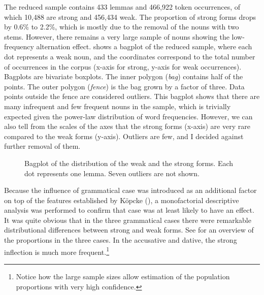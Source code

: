 \begin{styleMoutonText}
The reduced sample contains 433 lemmas and 466,922 token occurrences, of which 10,488 are strong and 456,434 weak. The proportion of strong forms drops by 0.6\% to 2.2\%, which is mostly due to the removal of the nouns with two stems. However, there remains a very large sample of nouns showing the low-frequency alternation effect.  shows a bagplot of the reduced sample, where each dot represents a weak noun, and the coordinates correspond to the total number of occurrences in the corpus (x-axis for strong, y-axis for weak occurrences). Bagplots \citep{RousseeuwEtAl1999} are bivariate boxplots. The inner polygon (\textit{bag}) contains half of the points. The outer polygon (\textit{fence}) is the bag grown by a factor of three. Data points outside the fence are considered outliers. This bagplot shows that there are many infrequent and few frequent nouns in the sample, which is trivially expected given the power-law distribution of word frequencies. However, we can also tell from the scales of the axes that the strong forms (x-axis) are very rare compared to the weak forms (y-axis). Outliers are few, and I decided against further removal of them.
\end{styleMoutonText}

  
 

\begin{styleMoutonCaption}\begin{figure}
\caption{Bagplot of the distribution of the weak and the strong forms. Each dot represents one lemma. Seven outliers are not shown.}
\label{fig:key:1}
\end{figure}\end{styleMoutonCaption}

\begin{styleMoutonText}
Because the influence of grammatical case was introduced as an additional factor on top of the features established by Köpcke (), a monofactorial descriptive analysis was performed to confirm that case was at least likely to have an effect. It was quite obvious that in the three grammatical cases there were remarkable distributional differences between strong and weak forms. See  for an overview of the proportions in the three cases. In the accusative and dative, the strong inflection is much more frequent.\footnote{Notice how the large sample sizes allow estimation of the population proportions with very high confidence.}
\end{styleMoutonText}

